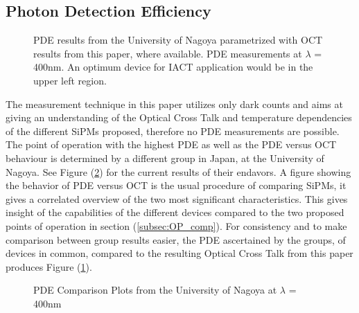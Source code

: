 \documentclass[12pt,article,type=msc,colorback,accentcolor=tud9c]{tudthesis}
\begin{document}
\subsection{Photon Detection Efficiency}
\begin{figure}[h!]
\begin{centering}
\caption[PDE versus OCT comparison]{PDE results from the University of Nagoya parametrized with OCT results from this paper, where available. PDE measurements at $\lambda$ = 400nm. An optimum device for IACT application would be in the upper left region.}
\label{fig:Nagoya_PDE_me_OCT}
\end{centering}
\end{figure}
The measurement technique in this paper utilizes only dark counts and aims at giving an understanding of the Optical Cross Talk and temperature dependencies of the different SiPMs proposed, therefore no PDE measurements are possible. The point of operation with the highest PDE as well as the PDE versus OCT behaviour is determined by a different group in Japan, at the University of Nagoya. See Figure (\ref{fig:Nagoya_PDE}) for the current results of their endavors. A figure showing the behavior of PDE versus OCT is the usual procedure of comparing SiPMs, it gives a correlated overview of the two most significant characteristics. This gives insight of the capabilities of the different devices compared to the two proposed points of operation in section (\ref{subsec:OP_comp}). For consistency and to make comparison between group results easier, the PDE ascertained by the groups, of devices in common, compared to the resulting Optical Cross Talk from this paper produces Figure (\ref{fig:Nagoya_PDE_me_OCT}).\\

\begin{figure}[b!]
\begin{centering}
\caption[PDE results from the University of Nagoya]{PDE Comparison Plots from the University of Nagoya at $\lambda$ = 400nm}
\label{fig:Nagoya_PDE}
\end{centering}
\end{figure}
\end{document}
